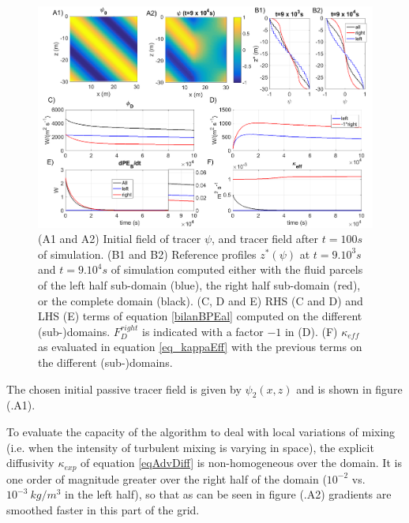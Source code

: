 \begin{figure}[h!]
\centering
\includegraphics[width=1\textwidth]{./CHAP_BPE/AGBPE_numlab2_2.png}
\caption{(A1 and A2) Initial field of tracer $\psi$, and tracer field after $t=100s$ of simulation. (B1 and B2) Reference profiles $z^*(\psi)$ at $t=9.10^3s$ and $t=9.10^4s$ of simulation computed either with the fluid parcels of the left half sub-domain (blue), the right half sub-domain (red), or the complete domain (black). (C, D and E) RHS (C and D) and LHS (E) terms of equation \ref{bilanBPEal} computed on the different (sub-)domains. $F_D^{right}$ is indicated with a factor $-1$ in (D). (F) $\kappa_{eff}$ as evaluated in equation \ref{eq_kappaEff} with the previous terms on the different (sub-)domains.}
\label{fig2numlab}
\end{figure}

The chosen initial passive tracer field is given by $\psi_2 (x,z)$ and is shown in figure (.A1).

To evaluate the capacity of the algorithm to deal with local variations of mixing (i.e. when the intensity of turbulent mixing is varying in space), the explicit diffusivity $\kappa_{exp}$ of equation \ref{eqAdvDiff} is non-homogeneous over the domain. It is one order of magnitude greater over the right half of the domain ($10^{-2}$ vs. $10^{-3} \ kg/m^3$ in the left half), so that as can be seen in figure (.A2) gradients are smoothed faster in this part of the grid.

